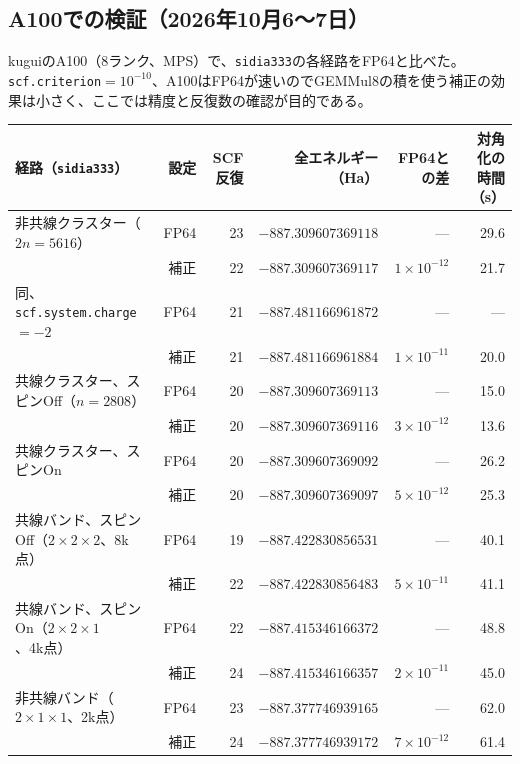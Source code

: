 \documentclass[a4paper,11pt]{ltjsarticle}
\newcommand{\code}[1]{\texttt{#1}}
\newcommand{\E}[1]{\times10^{#1}}
\begin{document}
\subsection{A100での検証（2026年10月6〜7日）}
kuguiのA100（8ランク、MPS）で、\code{sidia333}の各経路をFP64と比べた。\code{scf.criterion}$=10^{-10}$、A100はFP64が速いのでGEMMul8の積を使う補正の効果は小さく、ここでは精度と反復数の確認が目的である。

\noindent\begin{tabularx}{\linewidth}{@{}Yrrrrr@{}}
\toprule
経路（\code{sidia333}） & 設定 & SCF反復 & 全エネルギー（Ha） & FP64との差 & 対角化の時間（s）\\
\midrule
非共線クラスター（$2n=5616$） & FP64 & 23 & $-887.309607369118$ & --- & 29.6\\
 & 補正 & 22 & $-887.309607369117$ & $1\E{-12}$ & 21.7\\
同、\code{scf.system.charge}$=-2$ & FP64 & 21 & $-887.481166961872$ & --- & ---\\
 & 補正 & 21 & $-887.481166961884$ & $1\E{-11}$ & 20.0\\
共線クラスター、スピンOff（$n=2808$） & FP64 & 20 & $-887.309607369113$ & --- & 15.0\\
 & 補正 & 20 & $-887.309607369116$ & $3\E{-12}$ & 13.6\\
共線クラスター、スピンOn & FP64 & 20 & $-887.309607369092$ & --- & 26.2\\
 & 補正 & 20 & $-887.309607369097$ & $5\E{-12}$ & 25.3\\
共線バンド、スピンOff（$2\times2\times2$、8k点） & FP64 & 19 & $-887.422830856531$ & --- & 40.1\\
 & 補正 & 22 & $-887.422830856483$ & $5\E{-11}$ & 41.1\\
共線バンド、スピンOn（$2\times2\times1$、4k点） & FP64 & 22 & $-887.415346166372$ & --- & 48.8\\
 & 補正 & 24 & $-887.415346166357$ & $2\E{-11}$ & 45.0\\
非共線バンド（$2\times1\times1$、2k点） & FP64 & 23 & $-887.377746939165$ & --- & 62.0\\
 & 補正 & 24 & $-887.377746939172$ & $7\E{-12}$ & 61.4\\
\bottomrule
\end{tabularx}
\end{document}
